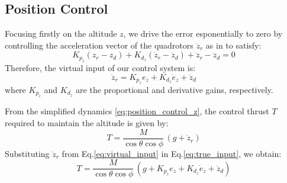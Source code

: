 \subsection{Position Control}
Focusing firstly on the altitude $z$,
we drive the error esponentially to zero by controlling the acceleration
vector of the quadrotors $\ddot{z}_r$ as in \cite{simplified_model} to satisfy:
\[
 K_{p_z} ( z_r - z_d )  + K_{d_z} (\dot{z}_r - \dot{z}_d ) + \ddot{z}_r - \ddot{z}_d = 0
\]
\noindent
Therefore, the virtual input of our control system is:
\begin{equation}
    \ddot{z}_r  =  K_{p_z} e_z + K_{d_z} \dot{e}_z + \ddot{z}_d
    \label{eq:virtual_input}
\end{equation}
where \( K_{p_z} \) and \( K_{d_z} \) are the  proportional and derivative gains, respectively.

\noindent
From the simplified dynamics \eqref{eq:position_control_z}, 
the control thrust \( T \) required to maintain the altitude is given by:
\begin{equation}
    T = \frac{M}{\cos\theta \cos\phi} \, (g + \ddot{z}_r)
    \label{eq:true_input}
\end{equation}
\noindent
Substituting \( \ddot{z}_r \) from Eq.\ref{eq:virtual_input} in Eq.\ref{eq:true_input},
we obtain:
\begin{equation}
    T = \frac{M}{\cos\theta \cos\phi} \, \left( g + K_{p_z} e_z + K_{d_z} \dot{e}_z + \ddot{z}_d \right)
    \label{eq:desired_thrust}
\end{equation}

